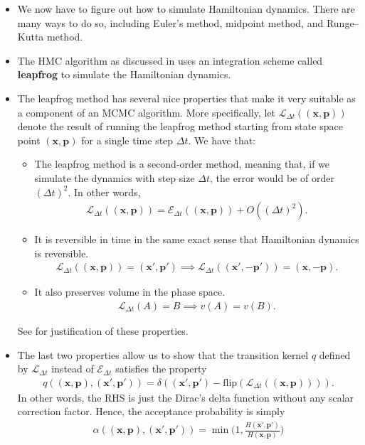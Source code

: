 \documentclass[10pt]{article}
\newcommand{\ve}[1]{\mathbf{#1}}
\newcommand{\mrm}[1]{\mathrm{#1}}
\newcommand{\mcal}[1]{\mathcal{#1}}
\begin{document}
\begin{itemize}
  \item We now have to figure out how to simulate Hamiltonian dynamics. There are many ways to do so, including Euler's method, midpoint method, and Runge--Kutta method.
  
  \item The HMC algorithm as discussed in \cite{Neal:2011} uses an integration scheme called {\bf leapfrog} to simulate the Hamiltonian dynamics.
  
  \item The leapfrog method has several nice properties that make it very suitable as a component of an MCMC algorithm. More specifically, let $\mcal{L}_{\Delta t}((\ve{x},\ve{p}))$ denote the result of running the leapfrog method starting from state space point $(\ve{x},\ve{p})$ for a single time step $\Delta t$. We have that:
  \begin{itemize}
    \item The leapfrog method is a second-order method, meaning that, if we simulate the dynamics with step size $\Delta t$, the error would be of order $(\Delta t)^2$. In other words,
    \begin{align*}
      \mcal{L}_{\Delta t}((\ve{x},\ve{p})) = \mcal{E}_{\Delta t}((\ve{x},\ve{p})) + O((\Delta t)^2).
    \end{align*}
    
    \item It is reversible in time in the same exact sense that Hamiltonian dynamics is reversible.
    \begin{align*}
      \mcal{L}_{\Delta t}((\ve{x},\ve{p})) = (\ve{x}',\ve{p}') 
      \implies \mcal{L}_{\Delta t}((\ve{x}',-\ve{p}')) = (\ve{x},-\ve{p}).
    \end{align*}
    
    \item It also preserves volume in the phase space.
    \begin{align*}
      \mcal{L}_{\Delta t}(A) = B \implies v(A) = v(B).
    \end{align*}
  \end{itemize}
  See \cite{Young:2014} for justification of these properties.
  
  \item The last two properties allow us to show that the transition kernel $q$ defined by $\mcal{L}_{\Delta t}$ instead of $\mcal{E}_{\Delta t}$ satisfies the property
  \begin{align*}
    q((\ve{x},\ve{p}),(\ve{x}',\ve{p}')) = \delta((\ve{x}',\ve{p}') - \mrm{flip}(\mcal{L}_{\Delta t}((\ve{x},\ve{p})))).
  \end{align*}
  In other words, the RHS is just the Dirac's delta function without any scalar correction factor. Hence, the acceptance probability is simply
  \begin{align*}
    \alpha((\ve{x},\ve{p}),(\ve{x}',\ve{p}')) = \min\bigg(1, \frac{H(\ve{x}',\ve{p}')}{H(\ve{x},\ve{p})}\bigg)
  \end{align*}


\end{itemize}
\end{document}

